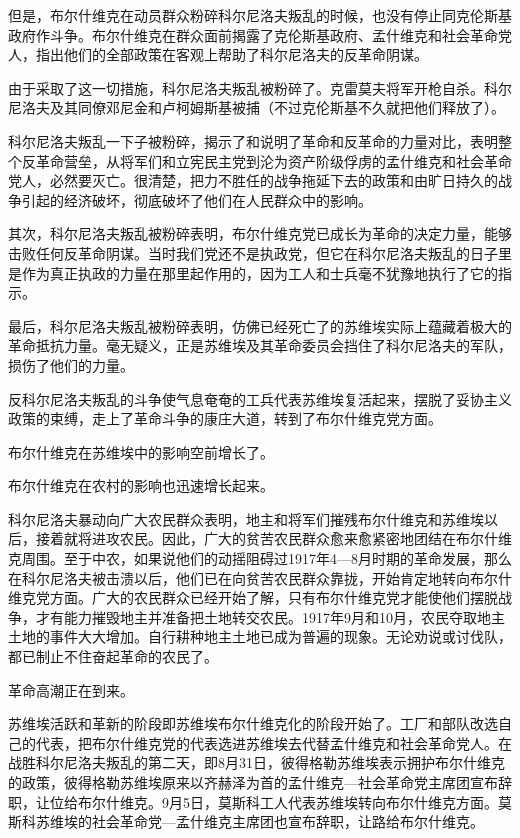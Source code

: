 但是，布尔什维克在动员群众粉碎科尔尼洛夫叛乱的时候，也没有停止同克伦斯基政府作斗争。布尔什维克在群众面前揭露了克伦斯基政府、孟什维克和社会革命党人，指出他们的全部政策在客观上帮助了科尔尼洛夫的反革命阴谋。

由于采取了这一切措施，科尔尼洛夫叛乱被粉碎了。克雷莫夫将军开枪自杀。科尔尼洛夫及其同僚邓尼金和卢柯姆斯基被捕（不过克伦斯基不久就把他们释放了）。

科尔尼洛夫叛乱一下子被粉碎，揭示了和说明了革命和反革命的力量对比，表明整个反革命营垒，从将军们和立宪民主党到沦为资产阶级俘虏的孟什维克和社会革命党人，必然要灭亡。很清楚，把力不胜任的战争拖延下去的政策和由旷日持久的战争引起的经济破坏，彻底破坏了他们在人民群众中的影响。

其次，科尔尼洛夫叛乱被粉碎表明，布尔什维克党已成长为革命的决定力量，能够击败任何反革命阴谋。当时我们党还不是执政党，但它在科尔尼洛夫叛乱的日子里是作为真正执政的力量在那里起作用的，因为工人和士兵毫不犹豫地执行了它的指示。

最后，科尔尼洛夫叛乱被粉碎表明，仿佛已经死亡了的苏维埃实际上蕴藏着极大的革命抵抗力量。毫无疑义，正是苏维埃及其革命委员会挡住了科尔尼洛夫的军队，损伤了他们的力量。

反科尔尼洛夫叛乱的斗争使气息奄奄的工兵代表苏维埃复活起来，摆脱了妥协主义政策的束缚，走上了革命斗争的康庄大道，转到了布尔什维克党方面。

布尔什维克在苏维埃中的影响空前增长了。

布尔什维克在农村的影响也迅速增长起来。

科尔尼洛夫暴动向广大农民群众表明，地主和将军们摧残布尔什维克和苏维埃以后，接着就将进攻农民。因此，广大的贫苦农民群众愈来愈紧密地团结在布尔什维克周围。至于中农，如果说他们的动摇阻碍过1917年4—8月时期的革命发展，那么在科尔尼洛夫被击溃以后，他们已在向贫苦农民群众靠拢，开始肯定地转向布尔什维克党方面。广大的农民群众已经开始了解，只有布尔什维克党才能使他们摆脱战争，才有能力摧毁地主并准备把土地转交农民。1917年9月和10月，农民夺取地主土地的事件大大增加。自行耕种地主土地已成为普遍的现象。无论劝说或讨伐队，都已制止不住奋起革命的农民了。

革命高潮正在到来。

苏维埃活跃和革新的阶段即苏维埃布尔什维克化的阶段开始了。工厂和部队改选自己的代表，把布尔什维克党的代表选进苏维埃去代替孟什维克和社会革命党人。在战胜科尔尼洛夫叛乱的第二天，即8月31日，彼得格勒苏维埃表示拥护布尔什维克的政策，彼得格勒苏维埃原来以齐赫泽为首的孟什维克—社会革命党主席团宣布辞职，让位给布尔什维克。9月5日，莫斯科工人代表苏维埃转向布尔什维克方面。莫斯科苏维埃的社会革命党—孟什维克主席团也宣布辞职，让路给布尔什维克。

